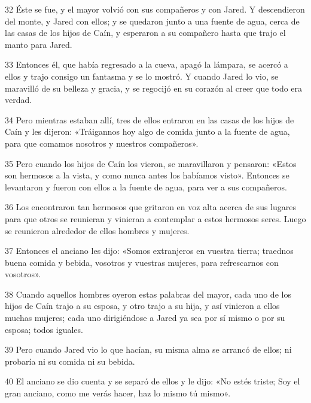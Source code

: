 \par 32 Éste se fue, y el mayor volvió con sus compañeros y con Jared. Y descendieron del monte, y Jared con ellos; y se quedaron junto a una fuente de agua, cerca de las casas de los hijos de Caín, y esperaron a su compañero hasta que trajo el manto para Jared.

\par 33 Entonces él, que había regresado a la cueva, apagó la lámpara, se acercó a ellos y trajo consigo un fantasma y se lo mostró. Y cuando Jared lo vio, se maravilló de su belleza y gracia, y se regocijó en su corazón al creer que todo era verdad.

\par 34 Pero mientras estaban allí, tres de ellos entraron en las casas de los hijos de Caín y les dijeron: «Tráigannos hoy algo de comida junto a la fuente de agua, para que comamos nosotros y nuestros compañeros».

\par 35 Pero cuando los hijos de Caín los vieron, se maravillaron y pensaron: «Estos son hermosos a la vista, y como nunca antes los habíamos visto». Entonces se levantaron y fueron con ellos a la fuente de agua, para ver a sus compañeros.

\par 36 Los encontraron tan hermosos que gritaron en voz alta acerca de sus lugares para que otros se reunieran y vinieran a contemplar a estos hermosos seres. Luego se reunieron alrededor de ellos hombres y mujeres.

\par 37 Entonces el anciano les dijo: «Somos extranjeros en vuestra tierra; traednos buena comida y bebida, vosotros y vuestras mujeres, para refrescarnos con vosotros».

\par 38 Cuando aquellos hombres oyeron estas palabras del mayor, cada uno de los hijos de Caín trajo a su esposa, y otro trajo a su hija, y así vinieron a ellos muchas mujeres; cada uno dirigiéndose a Jared ya sea por sí mismo o por su esposa; todos iguales.

\par 39 Pero cuando Jared vio lo que hacían, su misma alma se arrancó de ellos; ni probaría ni su comida ni su bebida.

\par 40 El anciano se dio cuenta y se separó de ellos y le dijo: «No estés triste; Soy el gran anciano, como me verás hacer, haz lo mismo tú mismo».

